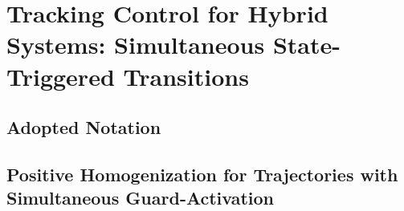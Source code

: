 \documentclass[../DC2017114Bouma.tex]{subfiles}
\begin{document}
\graphicspath{{03_Contribution/img/}}
\pagestyle{fancyreport}
\cleartooddpage
\pagestyle{fancyreport}
\chapter{Tracking Control for Hybrid Systems: Simultaneous State-Triggered Transitions}
\cite{Rijnen2018}
\section{Adopted Notation}
\section{Positive Homogenization for Trajectories with Simultaneous Guard-Activation}
\end{document}
